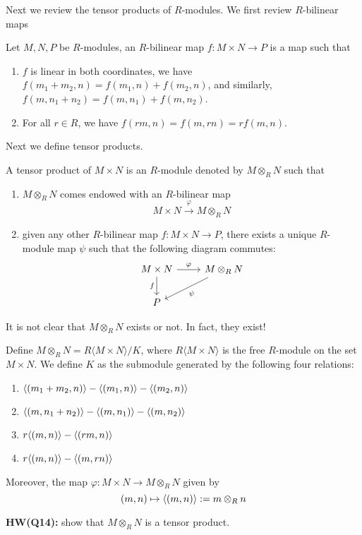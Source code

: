 Next we review the tensor products of $R$-modules. We first review $R$-bilinear maps 
\begin{defn}
    Let $M,N, P$ be $R$-modules, an $R$-bilinear map $f:M\times N\to P$ is a map such that 
    \begin{enumerate}
        \item $f$ is linear in both coordinates, we have $f(m_1+m_2,n)=f(m_1,n)+f(m_2,n)$, and similarly, $f(m,n_1+n_2)=f(m,n_1)+f(m,n_2)$.
        \item For all $r\in R$, we have $f(rm,n)=f(m,rn)=rf(m,n)$.
    \end{enumerate}
\end{defn}
Next we define tensor products.
\begin{defn}
    A tensor product of $M\times N$ is an $R$-module denoted by $M\otimes_R N$ such that 
    \begin{enumerate}
        \item $M\otimes_R N$ comes endowed with an $R$-bilinear map 
        \begin{equation*}
            M\times N\xrightarrow{\varphi}M\otimes_RN
        \end{equation*}
        \item given any other $R$-bilinear map $f: M\times N\to P$, there exists a unique $R$-module map $\psi$ such that the following diagram commutes:
        \[\begin{tikzcd}
            {M\times N} & {M\otimes_RN} \\
            P
            \arrow["\varphi", from=1-1, to=1-2]
            \arrow["f"', from=1-1, to=2-1]
            \arrow["\psi", from=1-2, to=2-1]
        \end{tikzcd}\]
    \end{enumerate}
\end{defn}
It is not clear that $M\otimes_RN$ exists or not. In fact, they exist!
\begin{thm}
    Define $M\otimes_RN=R\langle M\times N\rangle/K$, where $R\langle M\times N\rangle$ is the free $R$-module on the set $M\times N$. We define $K$ as the submodule generated by the following four relations:
    \begin{enumerate}
        \item $\langle(m_1+m_2,n)\rangle-\langle(m_1,n)\rangle-\langle(m_2,n)\rangle$
        \item $\langle(m,n_1+n_2)\rangle-\langle(m,n_1)\rangle-\langle(m,n_2)\rangle$
        \item $r\langle(m,n)\rangle-\langle(rm,n)\rangle$
        \item $r\langle(m,n)\rangle-\langle(m,rn)\rangle$
    \end{enumerate}
    Moreover, the map $\varphi:M\times N\to M\otimes_RN$ given by 
    \begin{equation*}
        (m,n)\mapsto \langle(m,n)\rangle:=m\otimes_Rn
    \end{equation*}
\end{thm}
\begin{prob}
    \textbf{HW(Q14):} show that $M\otimes_RN$ is a tensor product.
\end{prob}

